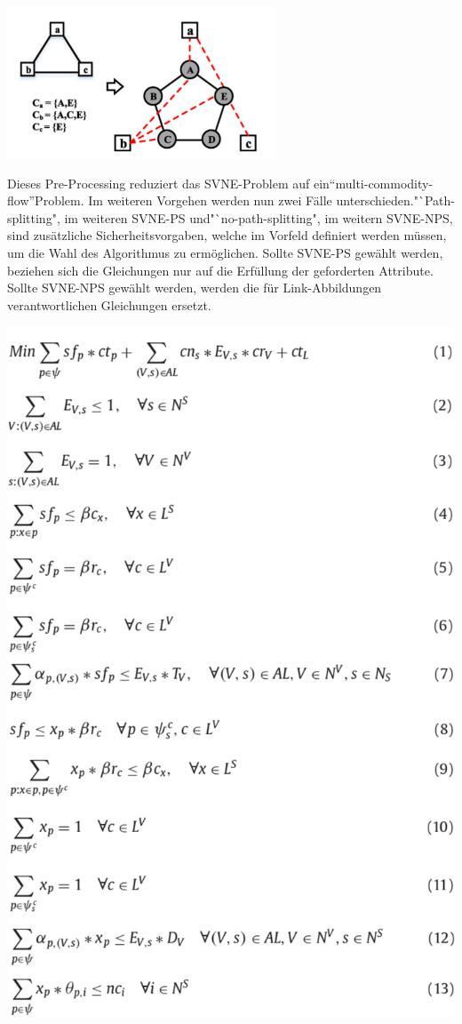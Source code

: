 \documentclass{lni}
\begin{document}
\begin{center}
	\includegraphics[width=0.6\textwidth]{auxgraph.pdf}\newline 
\end{center}
Dieses Pre-Processing reduziert das SVNE-Problem auf ein"`multi-commodity-flow"'Problem. \cite{MCF}
Im weiteren Vorgehen werden nun zwei Fälle unterschieden."`Path-splitting", im weiteren SVNE-PS und"`no-path-splitting", im weitern SVNE-NPS, sind zusätzliche Sicherheitsvorgaben, welche im Vorfeld definiert werden müssen, um die Wahl des Algorithmus zu ermöglichen. Sollte SVNE-PS gewählt werden, beziehen sich die Gleichungen nur auf die Erfüllung der geforderten Attribute.
Sollte SVNE-NPS gewählt werden, werden die für Link-Abbildungen verantwortlichen Gleichungen ersetzt.\newline
\begin{center}
	\includegraphics[width=1\textwidth]{algo.pdf}\newline
\end{center}
\end{document}
